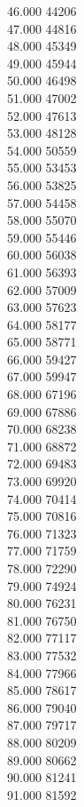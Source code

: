 { 46.000	44206 \\
 47.000	44816 \\
 48.000	45349 \\
 49.000	45944 \\
 50.000	46498 \\
 51.000	47002 \\
 52.000	47613 \\
 53.000	48128 \\
 54.000	50559 \\
 55.000	53453 \\
 56.000	53825 \\
 57.000	54458 \\
 58.000	55070 \\
 59.000	55446 \\
 60.000	56038 \\
 61.000	56393 \\
 62.000	57009 \\
 63.000	57623 \\
 64.000	58177 \\
 65.000	58771 \\
 66.000	59427 \\
 67.000	59947 \\
 68.000	67196 \\
 69.000	67886 \\
 70.000	68238 \\
 71.000	68872 \\
 72.000	69483 \\
 73.000	69920 \\
 74.000	70414 \\
 75.000	70816 \\
 76.000	71323 \\
 77.000	71759 \\
 78.000	72290 \\
 79.000	74924 \\
 80.000	76231 \\
 81.000	76750 \\
 82.000	77117 \\
 83.000	77532 \\
 84.000	77966 \\
 85.000	78617 \\
 86.000	79040 \\
 87.000	79717 \\
 88.000	80209 \\
 89.000	80662 \\
 90.000	81241 \\
 91.000	81592 \\
}
